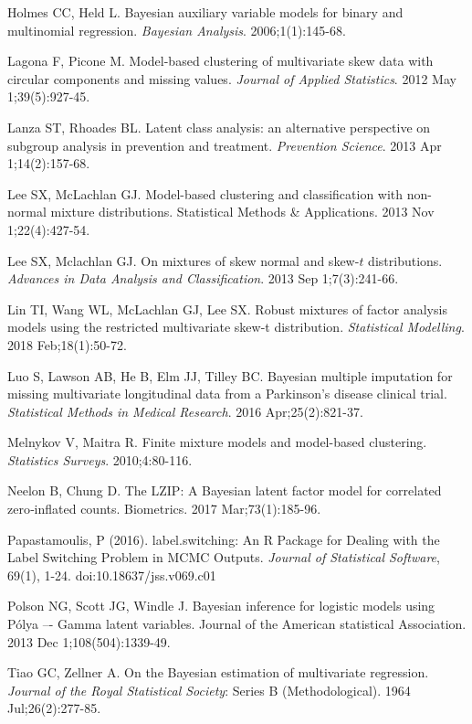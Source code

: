 \documentclass[useAMS,referee]{biom}
\begin{document}
\begin{thebibliography}{}
\bibitem{ } Holmes CC, Held L. Bayesian auxiliary variable models for binary and multinomial regression. \textit{Bayesian Analysis}. 2006;1(1):145-68.

\bibitem{ } Lagona F, Picone M. Model-based clustering of multivariate skew data with circular components and missing values. \textit{Journal of Applied Statistics}. 2012 May 1;39(5):927-45.

\bibitem{ } Lanza ST, Rhoades BL. Latent class analysis: an alternative perspective on subgroup analysis in prevention and treatment. \textit{Prevention Science}. 2013 Apr 1;14(2):157-68.

\bibitem{ } Lee SX, McLachlan GJ. Model-based clustering and classification with non-normal mixture distributions. Statistical Methods \& Applications. 2013 Nov 1;22(4):427-54.

\bibitem{ } Lee SX, Mclachlan GJ. On mixtures of skew normal and skew-$t$ distributions. \textit{Advances in Data Analysis and Classification}. 2013 Sep 1;7(3):241-66.

\bibitem{ } Lin TI, Wang WL, McLachlan GJ, Lee SX. Robust mixtures of factor analysis models using the restricted multivariate skew-t distribution. \textit{Statistical Modelling}. 2018 Feb;18(1):50-72.

\bibitem{ } Luo S, Lawson AB, He B, Elm JJ, Tilley BC. Bayesian multiple imputation for missing multivariate longitudinal data from a Parkinson's disease clinical trial. \textit{Statistical Methods in Medical Research}. 2016 Apr;25(2):821-37.

\bibitem{ } Melnykov V, Maitra R. Finite mixture models and model-based clustering. \textit{Statistics Surveys}. 2010;4:80-116.

\bibitem{ } Neelon B, Chung D. The LZIP: A Bayesian latent factor model for correlated zero‐inflated counts. Biometrics. 2017 Mar;73(1):185-96.

\bibitem{ } Papastamoulis, P (2016). label.switching: An R Package for Dealing with the Label Switching Problem in MCMC Outputs. \textit{Journal of Statistical Software}, 69(1), 1-24. doi:10.18637/jss.v069.c01

\bibitem{ } Polson NG, Scott JG, Windle J. Bayesian inference for logistic models using P\'olya –- Gamma latent variables. Journal of the American statistical Association. 2013 Dec 1;108(504):1339-49.

\bibitem{ } Tiao GC, Zellner A. On the Bayesian estimation of multivariate regression. \textit{Journal of the Royal Statistical Society}: Series B (Methodological). 1964 Jul;26(2):277-85.


\end{thebibliography}
\end{document}
